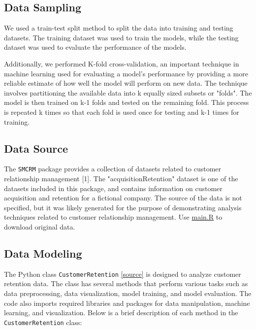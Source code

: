 \hypertarget{data-sampling}{%
\subsection{Data Sampling}\label{data-sampling}}

We used a train-test split method to split the data into training and
testing datasets. The training dataset was used to train the models,
while the testing dataset was used to evaluate the performance of the
models.

Additionally, we performed K-fold cross-validation, an important
technique in machine learning used for evaluating a model's performance
by providing a more reliable estimate of how well the model will perform
on new data. The technique involves partitioning the available data into
k equally sized subsets or "folds". The model is then trained on k-1
folds and tested on the remaining fold. This process is repeated k times
so that each fold is used once for testing and k-1 times for training.

\hypertarget{data-source}{%
\subsection{Data Source}\label{data-source}}

The \texttt{SMCRM} package provides a collection of datasets related to
customer relationship management {[}1{]}. The "acquisitionRetention"
dataset is one of the datasets included in this package, and contains
information on customer acquisition and retention for a fictional
company. The source of the data is not specified, but it was likely
generated for the purpose of demonstrating analysis techniques related
to customer relationship management. Use
\href{https://github.com/eriosta/analytics-applications/blob/main/customers/main.R}{main.R}
to download original data.

\hypertarget{data-modeling}{%
\subsection{Data Modeling}\label{data-modeling}}

The Python class \texttt{CustomerRetention}
\href{https://github.com/eriosta/analytics-applications/blob/main/customers/main.py}{{[}source{]}}
is designed to analyze customer retention data. The class has several
methods that perform various tasks such as data preprocessing, data
visualization, model training, and model evaluation. The code also
imports required libraries and packages for data manipulation, machine
learning, and visualization. Below is a brief description of each method
in the \texttt{CustomerRetention} class:

